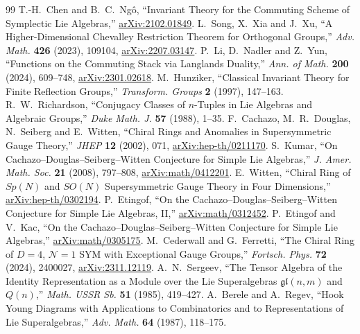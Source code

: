 \documentclass[11pt]{article}
\numberwithin{equation}{section}
\numberwithin{figure}{section}
\numberwithin{table}{section}
\begin{document}
\begin{thebibliography}{99}
T.-H.~Chen and B.~C.~Ng\^o, ``Invariant Theory for the Commuting Scheme of Symplectic Lie Algebras,'' \href{https://arxiv.org/abs/2102.01849}{arXiv:2102.01849}.
L.~Song, X.~Xia and J.~Xu, ``A Higher-Dimensional Chevalley Restriction Theorem for Orthogonal Groups,'' \emph{Adv. Math.} \textbf{426} (2023), 109104, \href{https://arxiv.org/abs/2207.03147}{arXiv:2207.03147}.
P.~Li, D.~Nadler and Z.~Yun, ``Functions on the Commuting Stack via Langlands Duality,'' \emph{Ann. of Math.} \textbf{200} (2024), 609--748, \href{https://arxiv.org/abs/2301.02618}{arXiv:2301.02618}.
M.~Hunziker, ``Classical Invariant Theory for Finite Reflection Groups,'' \emph{Transform. Groups} \textbf{2} (1997), 147--163.
R.~W.~Richardson, ``Conjugacy Classes of $n$-Tuples in Lie Algebras and Algebraic Groups,'' \emph{Duke Math. J.} \textbf{57} (1988), 1--35.
F.~Cachazo, M.~R.~Douglas, N.~Seiberg and E.~Witten, ``Chiral Rings and Anomalies in Supersymmetric Gauge Theory,'' \emph{JHEP} \textbf{12} (2002), 071, \href{https://arxiv.org/abs/hep-th/0211170}{arXiv:hep-th/0211170}.
S.~Kumar, ``On Cachazo--Douglas--Seiberg--Witten Conjecture for Simple Lie Algebras,'' \emph{J. Amer. Math. Soc.} \textbf{21} (2008), 797--808, \href{https://arxiv.org/abs/math/0412201}{arXiv:math/0412201}.
E.~Witten, ``Chiral Ring of $Sp(N)$ and $SO(N)$ Supersymmetric Gauge Theory in Four Dimensions,'' \href{https://arxiv.org/abs/hep-th/0302194}{arXiv:hep-th/0302194}.
P.~Etingof, ``On the Cachazo--Douglas--Seiberg--Witten Conjecture for Simple Lie Algebras, II,'' \href{https://arxiv.org/abs/math/0312452}{arXiv:math/0312452}.
P.~Etingof and V.~Kac, ``On the Cachazo--Douglas--Seiberg--Witten Conjecture for Simple Lie Algebras,'' \href{https://arxiv.org/abs/math/0305175}{arXiv:math/0305175}.
M.~Cederwall and G.~Ferretti, ``The Chiral Ring of $D=4$, $\mathcal N=1$ SYM with Exceptional Gauge Groups,'' \emph{Fortsch. Phys.} \textbf{72} (2024), 2400027, \href{https://arxiv.org/abs/2311.12119}{arXiv:2311.12119}.
A.~N.~Sergeev, ``The Tensor Algebra of the Identity Representation as a Module over the Lie Superalgebras $\mathfrak{gl}(n,m)$ and $Q(n)$,'' \emph{Math. USSR Sb.} \textbf{51} (1985), 419--427.
A.~Berele and A.~Regev, ``Hook Young Diagrams with Applications to Combinatorics and to Representations of Lie Superalgebras,'' \emph{Adv. Math.} \textbf{64} (1987), 118--175.

\end{thebibliography}
\end{document}
